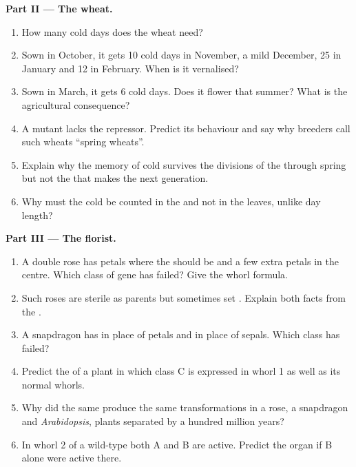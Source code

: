 \begin{problem}
\medskip
\noindent\textbf{Part II --- The wheat.}
\begin{enumerate}[resume]
  \item How many cold days does the wheat need?
  \item Sown in October, it gets 10 cold days in November, a mild
        December, 25 in January and 12 in February. When is it
        vernalised?
  \item Sown in March, it gets 6 cold days. Does it flower that
        summer? What is the agricultural consequence?
  \item A mutant lacks the repressor. Predict its behaviour and say
        why breeders call such wheats ``spring wheats''.
  \item Explain why the memory of cold survives the divisions of the
         through spring but not the  that makes the
        next generation.
  \item Why must the cold be counted in the  and not in the
        leaves, unlike day length?
\end{enumerate}

\medskip
\noindent\textbf{Part III --- The florist.}
\begin{enumerate}[resume]
  \item A double rose has petals where the  should be and a
        few extra petals in the centre. Which class of gene has
        failed? Give the whorl formula.
  \item Such roses are sterile as  parents but sometimes set
        . Explain both facts from the .
  \item A snapdragon has  in place of petals and  in
        place of sepals. Which class has failed?
  \item Predict the  of a plant in which class C is expressed
        in whorl 1 as well as its normal whorls.
  \item Why did the same  produce the same transformations
        in a rose, a snapdragon and \emph{Arabidopsis}, plants
        separated by a hundred million years?
  \item In whorl 2 of a wild-type  both A and B are active.
        Predict the organ if B alone were active there.
\end{enumerate}


\end{problem}
